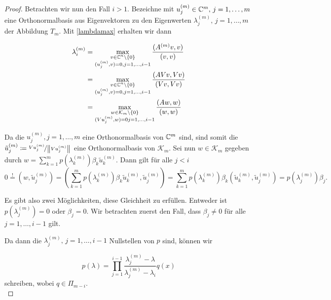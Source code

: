 \documentclass{article}
\begin{document}
\begin{theorem}
\begin{proof}
	Betrachten wir nun den Fall $i>1$.
	Bezeichne mit $u_j^{(m)} \in \mathbb{C}^m, \, j = 1,\dots, m$ eine Orthonormalbasis aus Eigenvektoren zu den Eigenwerten $\lambda_j^{(m)} , \, j = 1,\dots, m$ der Abbildung $T_m$. Mit \eqref{lambdamax} erhalten wir dann

	\begin{equation}
		\begin{aligned}
			\label{Darstellung EW}
			\lambda_i^{(m)} &= \max_{\substack{v\in \mathbb{C}^n\setminus \{0\} \\ (u_j^{(m)},v) = 0, j = 1,\dots,i-1}} \frac{(A^{(m)}v,v)}{(v,v)} \\
			&= \max_{\substack{v\in \mathbb{C}^n\setminus \{0\} \\ (u_j^{(m)},v) = 0, j = 1,\dots,i-1}} \frac{(AVv,Vv)}{(Vv,Vv)}\\
			&= \max_{\substack{w\in \mathcal{K}_m\setminus \{0\} \\ (Vu_j^{(m)},w) = 0 j = 1,\dots,i-1}} \frac{(Aw,w)}{(w,w)}
		\end{aligned}
	\end{equation}

	Da die $u_j^{(m)}, j = 1,\dots,m$ eine Orthonormalbasis von $\mathbb{C}^m$ sind, sind somit die $\tilde{u}_j^{(m)} \coloneqq \nicefrac{Vu_j^{(m)}}{{\left \| Vu_j^{(m)} \right \|}_{}}$ eine Orthonormalbasis von $\mathcal{K}_m$. Sei nun $w\in \mathcal{K}_m$ gegeben durch $w = \sum_{k=1}^{m} p(\lambda_k^{(m)}) \beta_k \tilde{u}_k^{(m)}$. Dann gilt für alle $j < i$
	\begin{equation*}
		0 \stackrel{!}{=} (w,\tilde{u}_j^{(m)}) = (\sum_{k=1}^{m} p(\lambda_k^{(m)}) \beta_k \tilde{u}_k^{(m)},\tilde{u}_j^{(m)}) = \sum_{k=1}^{m} p(\lambda_k^{(m)}) \beta_k (\tilde{u}_k^{(m)},\tilde{u}_j^{(m)}) = p(\lambda_j^{(m)}) \beta_j.
	\end{equation*}

	Es gibt also zwei Möglichkeiten, diese Gleichheit zu erfüllen. Entweder ist $p(\lambda_j^{(m)}) = 0$ oder $\beta_j = 0$. Wir betrachten zuerst den Fall, dass  $\beta_j \neq 0$ für alle $j = 1,\dots, i-1$ gilt.

	Da dann die $\lambda_j^{(m)}, \, j = 1,\dots,i-1$ Nullstellen von $p$ sind, können wir

	\begin{equation*}
		p(\lambda) = \prod_{j = 1}^{i-1} \frac{\lambda_j^{(m)} -\lambda}{\lambda_j^{(m)} - \lambda_i} q(x)
	\end{equation*}
	schreiben, wobei $q \in \Pi_{m-i}$.\\


\end{proof}
\end{theorem}
\end{document}
